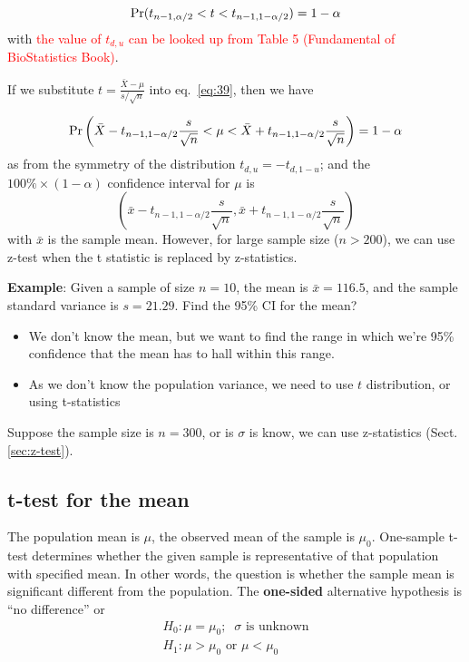 \begin{equation}
  \label{eq:39}
\text{Pr}(t_{n-1,\alpha/2} < t < t_{n-1,1-\alpha/2}) = 1- \alpha
\end{equation}
with
\textcolor{red}{the value of $t_{d,u}$ can be looked up from Table 5
  (Fundamental of BioStatistics Book)}.

If we substitute $t=\frac{\bar{X}-\mu}{s/\sqrt{n}}$ into
eq.~\eqref{eq:39}, then we have

\begin{equation}
  \label{eq:41}
  \text{Pr}\left(\bar{X} - t_{n-1,1-\alpha/2} \frac{s}{\sqrt{n}} < \mu < \bar{X} +
    t_{n-1,1-\alpha/2} \frac{s}{\sqrt{n}}\right) = 1-\alpha
\end{equation}
as from the symmetry of the distribution $t_{d,u}=-t_{d,1-u}$; and the
$100\%\times (1-\alpha)$ confidence interval for $\mu$ is
\begin{equation}
  \label{eq:40}
  \left(\bar{x} - t_{n-1,1-\alpha/2} \frac{s}{\sqrt{n}},  \bar{x} +
    t_{n-1,1-\alpha/2} \frac{s}{\sqrt{n}}\right) 
\end{equation}
with $\bar{x}$ is the sample mean.  However, for large sample size ($n
> 200$), we can use z-test when the t statistic is replaced by
z-statistics.

{\bf Example}: Given a sample of size $n=10$, the mean is
$\bar{x}=116.5$, and the sample standard variance is $s=21.29$. Find
the 95\% CI for the mean?
\begin{itemize}
\item We don't know the mean, but we want to find the range in which
  we're 95\% confidence that the mean has to hall within this range. 
\item As we don't know the population variance, we need to use $t$
  distribution, or using t-statistics 
\end{itemize}
Suppose the sample size is $n=300$, or is $\sigma$ is know, we can use
z-statistics (Sect.\ref{sec:z-test}). 

\subsection{t-test for the mean}
\label{sec:one-sample-t}

The population mean is $\mu$, the observed mean of the sample is $\mu_0$.
One-sample t-test determines whether the given sample is representative of that
population with specified mean. In other words, the question is whether the
sample mean is significant different from the population. The {\bf one-sided}
alternative hypothesis is ``no difference'' or
\begin{equation*}
  \begin{split}
    H_0: \mu = \mu_0;\;\; \sigma \text{ is unknown}\\
    H_1: \mu > \mu_0 \text{ or } \mu < \mu_0
  \end{split}
\end{equation*}

